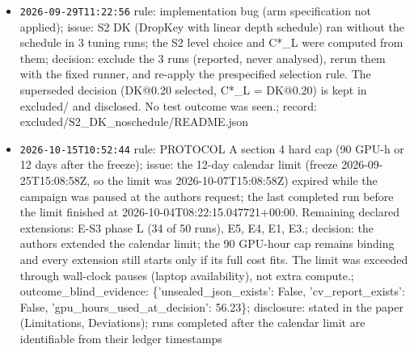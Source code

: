 \documentclass[11pt]{article}
\begin{document}
\begin{itemize}
\item \texttt{2026-09-29T11:22:56} rule: implementation bug (arm specification not applied); issue: S2 DK (DropKey with linear depth schedule) ran without the schedule in 3 tuning runs; the S2 level choice and C*\_L were computed from them; decision: exclude the 3 runs (reported, never analysed), rerun them with the fixed runner, and re-apply the prespecified selection rule. The superseded decision (DK@0.20 selected, C*\_L = DK@0.20) is kept in excluded/ and disclosed. No test outcome was seen.; record: excluded/S2\_DK\_noschedule/README.json
\item \texttt{2026-10-15T10:52:44} rule: PROTOCOL A section 4 hard cap (90 GPU-h or 12 days after the freeze); issue: the 12-day calendar limit (freeze 2026-09-25T15:08:58Z, so the limit was 2026-10-07T15:08:58Z) expired while the campaign was paused at the authors request; the last completed run before the limit finished at 2026-10-04T08:22:15.047721+00:00. Remaining declared extensions: E-S3 phase L (34 of 50 runs), E5, E4, E1, E3.; decision: the authors extended the calendar limit; the 90 GPU-hour cap remains binding and every extension still starts only if its full cost fits. The limit was exceeded through wall-clock pauses (laptop availability), not extra compute.; outcome\_blind\_evidence: \{'unsealed\_json\_exists': False, 'cv\_report\_exists': False, 'gpu\_hours\_used\_at\_decision': 56.23\}; disclosure: stated in the paper (Limitations, Deviations); runs completed after the calendar limit are identifiable from their ledger timestamps
\end{itemize}
\end{document}
